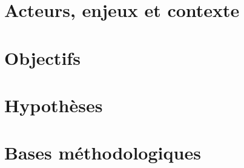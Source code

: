 \section{Acteurs, enjeux et contexte}
\section{Objectifs}
\section{Hypothèses }
\section{Bases méthodologiques}